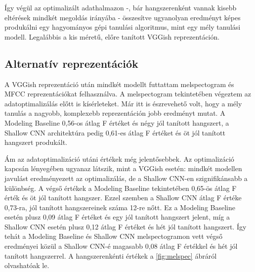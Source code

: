 Így végül az optimalizált adathalmazon -, bár hangszerenként vannak kisebb eltérések mindkét megoldás irányába - összesítve ugyanolyan eredményt képes produkálni egy hagyományos gépi tanulási algoritmus, mint egy mély tanulási modell. Legalábbis a kis méretű, előre tanított VGGish reprezentáción.

\subsection{Alternatív reprezentációk}

A VGGish reprezentáció után mindkét modellt futtattam melspectogram és MFCC reprezentációkat felhasználva. A melspectogram tekintetében végeztem az adatoptimalizálás előtt is kísérleteket. Már itt is észrevehető volt, hogy a mély tanulás a nagyobb, komplexebb reprezentáción jobb eredményt mutat. A Modeling Baseline 0,56-os átlag F értéket és négy jól tanított hangszert, a Shallow CNN architektúra pedig 0,61-es átlag F értéket és öt jól tanított hangszert produkált.

Ám az adatoptimalizáció utáni értékek még jelentősebbek. Az optimalizáció kapcsán lényegében ugyanaz látszik, mint a VGGish esetén: mindkét modellen javulást eredményezett az optimalizálás, de a Shallow CNN-en szignifikánsabb a különbség. A végső értékek a Modeling Baseline tekintetében 0,65-ös átlag F érték és öt jól tanított hangszer. Ezzel szemben a Shallow CNN átlag F értéke 0,73-ra, jól tanított hangszereinek száma 12-re nőtt. Ez a Modeling Baseline esetén plusz 0,09 átlag F értéket és egy jól tanított hangszert jelent, míg a Shallow CNN esetén plusz 0,12 átlag F értéket és hét jól tanított hangszert. Így tehát a Modeling Baseline és Shallow CNN melspectogramon vett végső eredményei közül a Shallow CNN-é magasabb 0,08 átlag F értékkel és hét jól tanított hangszerrel. A hangszerenkénti értékek a \ref{fig:melspec} ábráról olvashatóak le.

